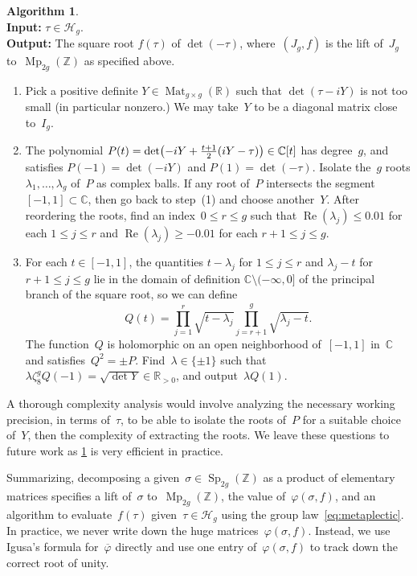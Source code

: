 \documentclass[12pt,oneside]{amsart}
\numberwithin{equation}{section}
\theoremstyle{definition}
\newtheorem{algorithm}[equation]{Algorithm}
\newcommand{\algoinput}[1]{~\\ \noindent\textbf{Input:} #1}
\newcommand{\algooutput}[1]{~\\ \noindent\textbf{Output:} #1}
\newcommand{\Z}{\mathbb{Z}}
\newcommand{\R}{\mathbb{R}}
\newcommand{\C}{\mathbb{C}}
\newcommand{\Half}{\mathcal{H}}
\renewcommand{\phi}{\varphi}
\DeclareMathOperator{\re}{Re}
\DeclareMathOperator{\Sp}{Sp}
\DeclareMathOperator{\Mp}{Mp}
\DeclareMathOperator{\Mat}{Mat}
\DeclarePairedDelimiter{\paren}{(}{)}
\begin{document}
\begin{algorithm}
  \label{algo:metaplectic}
  \algoinput{$\tau\in \Half_g$.}  \algooutput{The square root $f(\tau)$ of
    $\det(-\tau)$, where~$(J_g,f)$ is the lift of~$J_g$ to~$\Mp_{2g}(\Z)$ as
    specified above.}
  \begin{enumerate}
  \item Pick a positive definite $Y\in \Mat_{g\times g}(\R)$ such that
    $\det(\tau - iY)$ is not too small (in particular nonzero.) We may take~$Y$
    to be a diagonal matrix close to~$I_g$.
  \item The polynomial
    $P(t)=\det\paren[\big]{-iY + \tfrac{t+1}{2}(iY - \tau)} \in \C[t]$ has
    degree~$g$, and satisfies $P(-1) = \det(-iY)$ and $P(1) = \det(-\tau)$. Isolate
    the~$g$ roots $\lambda_1,\ldots,\lambda_g$ of~$P$ as complex balls. If any
    root of~$P$ intersects the segment $[-1,1]\subset\C$, then go back to
    step~(1) and choose another~$Y$. After reordering the roots, find an
    index~$0\leq r\leq g$ such that $\re(\lambda_j)\leq 0.01$ for each
    $1\leq j\leq r$ and $\re(\lambda_j)\geq -0.01$ for each $r+1\leq j\leq g$.
  \item For each $t\in [-1,1]$, the quantities $t-\lambda_j$ for
    $1\leq j\leq r$ and $\lambda_j - t$ for $r+1\leq j\leq g$ lie in the domain
    of definition $\C\setminus (-\infty,0]$ of the principal branch of the
    square root, so we can define
    \begin{displaymath}
      Q(t) = \prod_{j=1}^r \sqrt{t-\lambda_j} \prod_{j=r+1}^g \sqrt{\lambda_j - t}.
    \end{displaymath}
    The function~$Q$ is holomorphic on an open neighborhood of~$[-1,1]$ in~$\C$
    and satisfies~$Q^2 = \pm P$. Find~$\lambda\in \{\pm 1\}$ such
    that~$\lambda \zeta_8^{g} Q(-1) = \sqrt{\det Y}\in \R_{>0}$, and
    output~$\lambda Q(1)$.
  \end{enumerate}
\end{algorithm}

A thorough complexity analysis would involve analyzing the necessary working
precision, in terms of~$\tau$, to be able to isolate the roots of~$P$ for a
suitable choice of~$Y$, then the complexity of extracting the roots. We leave
these questions to future work as \cref{algo:metaplectic} is very efficient in
practice.

Summarizing, decomposing a given~$\sigma\in\Sp_{2g}(\Z)$ as a product of
elementary matrices specifies a lift of~$\sigma$ to~$\Mp_{2g}(\Z)$, the value
of~$\phi(\sigma,f)$, and an algorithm to evaluate~$f(\tau)$
given~$\tau\in \Half_g$ using the group law~\eqref{eq:metaplectic}. In
practice, we never write down the huge matrices~$\phi(\sigma,f)$.  Instead, we
use Igusa's formula for~$\overline{\phi}$ directly and use one entry
of~$\phi(\sigma,f)$ to track down the correct root of unity.
\end{document}
